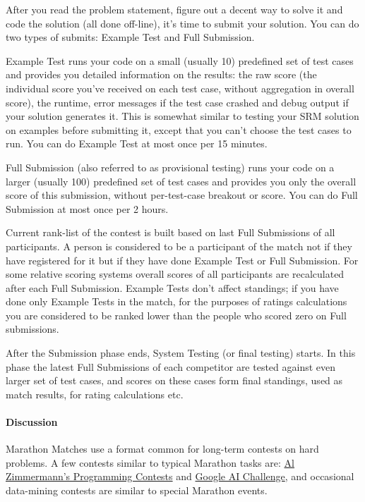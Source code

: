 After you read the problem statement, figure out a decent way to solve
it and code the solution (all done off-line), it's time to submit your
solution. You can do two types of submits: Example Test and Full
Submission.

Example Test runs your code on a small (usually 10) predefined set of
test cases and provides you detailed information on the results: the raw
score (the individual score you've received on each test case, without
aggregation in overall score), the runtime, error messages if the test
case crashed and debug output if your solution generates it. This is
somewhat similar to testing your SRM solution on examples before
submitting it, except that you can't choose the test cases to run. You
can do Example Test at most once per 15 minutes.

Full Submission (also referred to as provisional testing) runs your code
on a larger (usually 100) predefined set of test cases and provides you
only the overall score of this submission, without per-test-case
breakout or score. You can do Full Submission at most once per 2 hours.

Current rank-list of the contest is built based on last Full Submissions
of all participants. A person is considered to be a participant of the
match not if they have registered for it but if they have done Example
Test or Full Submission. For some relative scoring systems overall
scores of all participants are recalculated after each Full Submission.
Example Tests don't affect standings; if you have done only Example
Tests in the match, for the purposes of ratings calculations you are
considered to be ranked lower than the people who scored zero on Full
submissions.

After the Submission phase ends, System Testing (or final testing)
starts. In this phase the latest Full Submissions of each competitor are
tested against even larger set of test cases, and scores on these cases
form final standings, used as match results, for rating calculations
etc.

\hypertarget{discussion}{%
\paragraph{Discussion}\label{discussion}}

Marathon Matches use a format common for long-term contests on hard
problems. A few contests similar to typical Marathon tasks are:
\href{http://azspcs.com}{Al Zimmermann's Programming Contests} and
\href{http://aichallenge.org}{Google AI Challenge}, and occasional
data-mining contests are similar to special Marathon events.

